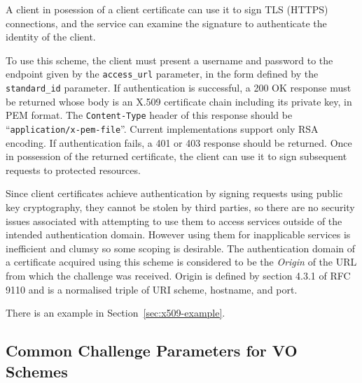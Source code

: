 \documentclass[11pt,a4paper]{ivoa}
\newcommand{\rfc}[1]{RFC\,#1}
\newcommand{\header}[1]{{\tt #1}}
\begin{document}
A client in posession of a client certificate can use it to
sign TLS (HTTPS) connections, and the service can examine the signature
to authenticate the identity of the client.


To use this scheme, the client must present a username and password
to the endpoint given by the \verb|access_url| parameter,
in the form defined by the \verb|standard_id| parameter.
If authentication is successful, a 200 OK response must be returned
whose body is an X.509 certificate chain including its private key,
in PEM format.  The \header{Content-Type} header of this response
should be ``{\tt application/x-pem-file}''. 
Current implementations support only RSA encoding.
If authentication fails, a 401 or 403 response should be returned.
Once in possession of the returned certificate,
the client can use it to sign subsequent requests to protected resources.

Since client certificates achieve authentication by signing requests
using public key cryptography, they cannot be stolen by third parties,
so there are no security issues associated with attempting to use them
to access services outside of the intended authentication domain.
However using them for inapplicable services is inefficient and clumsy
so some scoping is desirable.
The authentication domain of a certificate acquired using this scheme is
considered to be the {\em Origin\/} of the URL from which
the challenge was received.
Origin is defined by section 4.3.1 of \rfc{9110}
and is a normalised triple of URI scheme, hostname, and port.


There is an example in Section~\ref{sec:x509-example}.


\subsection{Common Challenge Parameters for VO Schemes}
\label{sec:common-params}
\end{document}
